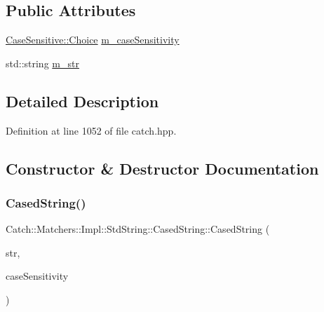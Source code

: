 \subsection*{Public Attributes}
\begin{DoxyCompactItemize}
\item 
\hyperlink{struct_catch_1_1_case_sensitive_aad49d3aee2d97066642fffa919685c6a}{Case\+Sensitive\+::\+Choice} \hyperlink{struct_catch_1_1_matchers_1_1_impl_1_1_std_string_1_1_cased_string_af399ed93051d8981e298206dee6898b3}{m\+\_\+case\+Sensitivity}
\item 
std\+::string \hyperlink{struct_catch_1_1_matchers_1_1_impl_1_1_std_string_1_1_cased_string_a9f8ce063a934330ac59bf8638f047e99}{m\+\_\+str}
\end{DoxyCompactItemize}


\subsection{Detailed Description}


Definition at line 1052 of file catch.\+hpp.



\subsection{Constructor \& Destructor Documentation}
\hypertarget{struct_catch_1_1_matchers_1_1_impl_1_1_std_string_1_1_cased_string_aebd017c88423d8a11c62cff85754a22d}{}\label{struct_catch_1_1_matchers_1_1_impl_1_1_std_string_1_1_cased_string_aebd017c88423d8a11c62cff85754a22d} 
\subsubsection{\texorpdfstring{Cased\+String()}{CasedString()}}
{\footnotesize\ttfamily Catch\+::\+Matchers\+::\+Impl\+::\+Std\+String\+::\+Cased\+String\+::\+Cased\+String (\begin{DoxyParamCaption}\item[{std\+::string const \&}]{str,  }\item[{\hyperlink{struct_catch_1_1_case_sensitive_aad49d3aee2d97066642fffa919685c6a}{Case\+Sensitive\+::\+Choice}}]{case\+Sensitivity }\end{DoxyParamCaption})\hspace{0.3cm}{\ttfamily [inline]}}



